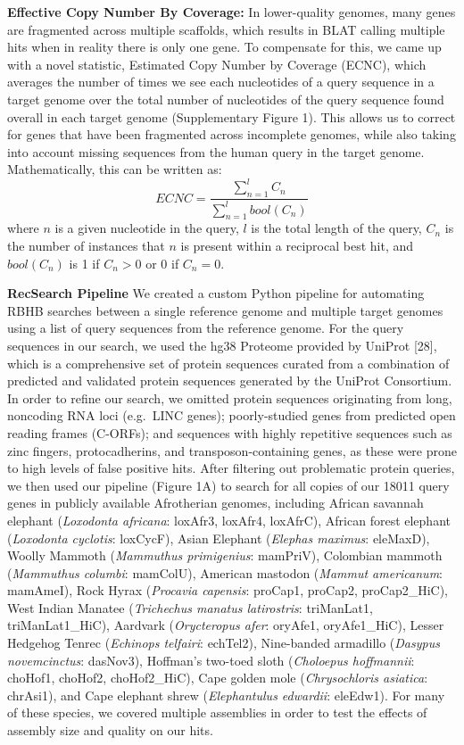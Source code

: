 \documentclass[10pt,letterpaper]{article}
\begin{document}
\textbf{Effective Copy Number By Coverage:} In lower-quality genomes,
many genes are fragmented across multiple scaffolds, which results in
BLAT calling multiple hits when in reality there is only one gene. To
compensate for this, we came up with a novel statistic, Estimated Copy
Number by Coverage (ECNC), which averages the number of times we see
each nucleotides of a query sequence in a target genome over the total
number of nucleotides of the query sequence found overall in each target
genome (Supplementary Figure 1). This allows us to correct for genes
that have been fragmented across incomplete genomes, while also taking
into account missing sequences from the human query in the target
genome. Mathematically, this can be written as:\\
\[ ECNC = \frac{\sum_{n=1}^{l} C_n}{\sum_{n=1}^{l} bool(C_n)}\] where
\(n\) is a given nucleotide in the query, \(l\) is the total length of
the query, \(C_n\) is the number of instances that \(n\) is present
within a reciprocal best hit, and \(bool(C_n)\) is 1 if \(C_n > 0\) or 0
if \(C_n = 0\).

\textbf{RecSearch Pipeline} We created a custom Python pipeline for
automating RBHB searches between a single reference genome and multiple
target genomes using a list of query sequences from the reference
genome. For the query sequences in our search, we used the hg38 Proteome
provided by UniProt {[}28{]}, which is a comprehensive set of protein
sequences curated from a combination of predicted and validated protein
sequences generated by the UniProt Consortium. In order to refine our
search, we omitted protein sequences originating from long, noncoding
RNA loci (e.g.~LINC genes); poorly-studied genes from predicted open
reading frames (C-ORFs); and sequences with highly repetitive sequences
such as zinc fingers, protocadherins, and transposon-containing genes,
as these were prone to high levels of false positive hits. After
filtering out problematic protein queries, we then used our pipeline
(Figure 1A) to search for all copies of our 18011 query genes in
publicly available Afrotherian genomes, including African savannah
elephant (\emph{Loxodonta africana}: loxAfr3, loxAfr4, loxAfrC), African
forest elephant (\emph{Loxodonta cyclotis}: loxCycF), Asian Elephant
(\emph{Elephas maximus}: eleMaxD), Woolly Mammoth (\emph{Mammuthus
primigenius}: mamPriV), Colombian mammoth (\emph{Mammuthus columbi}:
mamColU), American mastodon (\emph{Mammut americanum}: mamAmeI), Rock
Hyrax (\emph{Procavia capensis}: proCap1, proCap2, proCap2\_HiC), West
Indian Manatee (\emph{Trichechus manatus latirostris}: triManLat1,
triManLat1\_HiC), Aardvark (\emph{Orycteropus afer}: oryAfe1,
oryAfe1\_HiC), Lesser Hedgehog Tenrec (\emph{Echinops telfairi}:
echTel2), Nine-banded armadillo (\emph{Dasypus novemcinctus}: dasNov3),
Hoffman's two-toed sloth (\emph{Choloepus hoffmannii}: choHof1, choHof2,
choHof2\_HiC), Cape golden mole (\emph{Chrysochloris asiatica}:
chrAsi1), and Cape elephant shrew (\emph{Elephantulus edwardii}:
eleEdw1). For many of these species, we covered multiple assemblies in
order to test the effects of assembly size and quality on our hits.
\end{document}
